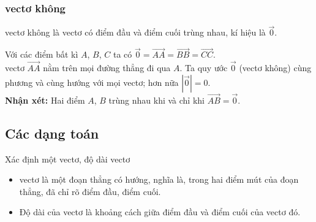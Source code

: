     \begin{vd}
    \end{vd}
    \subsubsection{vectơ không}
    \begin{dn}{}
    	vectơ không là vectơ có điểm đầu và điểm cuối trùng nhau, kí hiệu là $\vec{0}$.
    \end{dn}
    Với các điểm bất kì $A$, $B$, $C$ ta có $\vec{0} = \vec{AA} =\vec{BB} = \vec{CC}$.\\
    vectơ $\vec{AA}$ nằm trên mọi đường thẳng đi qua $A$. Ta quy ước $\vec{0}$ (vectơ không) cùng phương và cùng hướng với mọi vectơ; hơn nữa $\left| \vec{0} \right| = 0$.\\
    \textbf{Nhận xét:} Hai điểm $A$, $B$ trùng nhau khi và chỉ khi $\vec{AB} = \vec{0}$.


\subsection{Các dạng toán}

\begin{dang}{Xác định một vectơ, độ dài vectơ}
	\begin{itemize}
		\item vectơ là một đoạn thẳng có hướng, nghĩa là, trong hai điểm mút của đoạn thẳng, đã chỉ rõ điểm đầu, điểm cuối.
		\item Độ dài của vectơ là khoảng cách giữa điểm đầu và điểm cuối của vectơ đó.
	\end{itemize}
\end{dang}	

